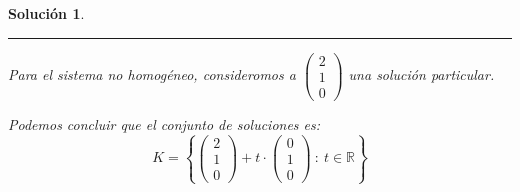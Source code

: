 \documentclass[letterpaper]{article}
\newcommand{\R}{\mathbb{R}}
\newtheorem*{sol}{Solución}
\begin{document}
\begin{enumerate}
\begin{enumerate}[label=(\alph*)]
\begin{sol}
    \noindent \rule{\linewidth}{0.2mm}

    Para el sistema no homogéneo, consideromos a $\begin{pmatrix}
        2\\
        1\\
        0
    \end{pmatrix}$ una solución particular.
    
    Podemos concluir que el conjunto de soluciones es:
    \[
        K = \left\{
        \begin{pmatrix}
            2\\
            1\\
            0
        \end{pmatrix} +
        t \cdot
        \begin{pmatrix}
            0\\
            1\\
            0
        \end{pmatrix}
        \: : \: t \in \R
        \right\}
    \]

    \end{sol}
\end{enumerate}

\end{enumerate}


\end{document}
